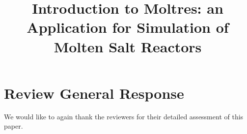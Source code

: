 \documentclass[answers,11pt]{exam}
\begin{document}



\title{Introduction to Moltres: an Application for Simulation of Molten Salt 
        Reactors}



%

\section*{Review General Response}
We would like to again thank the reviewers for their detailed assessment of 
this paper. 
\end{document}
